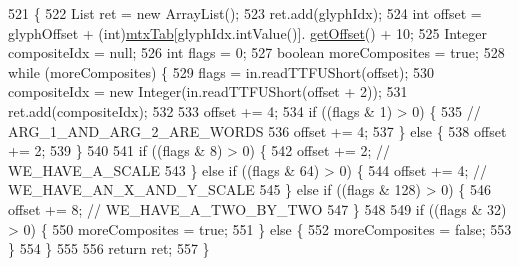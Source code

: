 \begin{DoxyCode}
521                                                                           \{
522         List ret = \textcolor{keyword}{new} ArrayList();
523         ret.add(glyphIdx);
524         \textcolor{keywordtype}{int} offset = glyphOffset + (int)\mbox{\hyperlink{classorg_1_1newdawn_1_1slick_1_1tools_1_1hiero_1_1truetype_1_1_t_t_f_file_ad78a13682e242fc4a0b5d34a8e5807fa}{mtxTab}}[glyphIdx.intValue()].
      \mbox{\hyperlink{classorg_1_1newdawn_1_1slick_1_1tools_1_1hiero_1_1truetype_1_1_t_t_f_mtx_entry_af6ea5be112bd06d92519fd86878e000d}{getOffset}}() + 10;
525         Integer compositeIdx = null;
526         \textcolor{keywordtype}{int} flags = 0;
527         \textcolor{keywordtype}{boolean} moreComposites = \textcolor{keyword}{true};
528         \textcolor{keywordflow}{while} (moreComposites) \{
529             flags = in.readTTFUShort(offset);
530             compositeIdx = \textcolor{keyword}{new} Integer(in.readTTFUShort(offset + 2));
531             ret.add(compositeIdx);
532 
533             offset += 4;
534             \textcolor{keywordflow}{if} ((flags & 1) > 0) \{
535                 \textcolor{comment}{// ARG\_1\_AND\_ARG\_2\_ARE\_WORDS}
536                 offset += 4;
537             \} \textcolor{keywordflow}{else} \{
538                 offset += 2;
539             \}
540 
541             \textcolor{keywordflow}{if} ((flags & 8) > 0) \{
542                 offset += 2;    \textcolor{comment}{// WE\_HAVE\_A\_SCALE}
543             \} \textcolor{keywordflow}{else} \textcolor{keywordflow}{if} ((flags & 64) > 0) \{
544                 offset += 4;    \textcolor{comment}{// WE\_HAVE\_AN\_X\_AND\_Y\_SCALE}
545             \} \textcolor{keywordflow}{else} \textcolor{keywordflow}{if} ((flags & 128) > 0) \{
546                 offset += 8;    \textcolor{comment}{// WE\_HAVE\_A\_TWO\_BY\_TWO}
547             \}
548 
549             \textcolor{keywordflow}{if} ((flags & 32) > 0) \{
550                 moreComposites = \textcolor{keyword}{true};
551             \} \textcolor{keywordflow}{else} \{
552                 moreComposites = \textcolor{keyword}{false};
553             \}
554         \}
555 
556         \textcolor{keywordflow}{return} ret;
557     \}
\end{DoxyCode}
\mbox{\label{classorg_1_1newdawn_1_1slick_1_1tools_1_1hiero_1_1truetype_1_1_t_t_f_sub_set_file_a45ad92d45877b63239a2d2a849c8552d}} 
